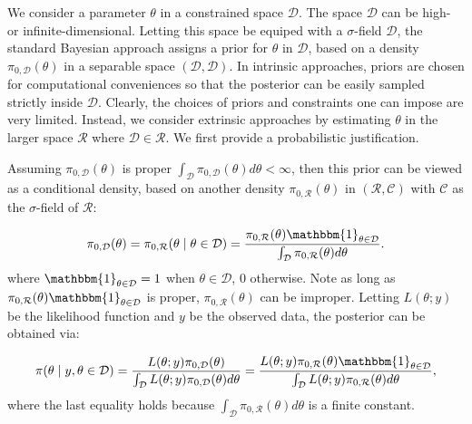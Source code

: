 \documentclass[10pt]{article}
\newcommand{\mc}[1]{\mathcal{#1}}
\begin{document}
We consider a parameter $\theta$ in a constrained space $\mc D$. The space $\mc D$ can be high- or infinite-dimensional. Letting this space be equiped with a $\sigma$-field $\mathscr D$, the standard Bayesian approach assigns a prior for $\theta$ in $\mc D$, based on a density $\pi_{0,\mc D}(\theta)$ in a separable space $(\mc D, \mathscr D)$. In intrinsic approaches, priors are chosen for computational conveniences so that the posterior can be easily sampled strictly inside $\mc D$. Clearly, the choices of priors and constraints one can impose are very limited. Instead, we consider extrinsic approaches by estimating $\theta$ in the larger space $\mc R$ where $\mc D\in \mc R$. We first provide a probabilistic justification.


Assuming $\pi_{0,\mc D}(\theta)$ is proper $\int_{\mc D} \pi_{0,\mc D}(\theta) d\theta <\infty$, then this prior can be viewed as a conditional density, based on another density $\pi_{0,\mc R}(\theta)$ in $(\mc R, \mathscr C)$ with $\mathscr C$ as the $\sigma$-field of $\mc R$:

\begin{equation}
\begin{aligned}
\pi_{0,\mc D}(\theta)= \pi_{0,\mc R}(\theta \mid \theta \in \mc D) = \frac{ \pi_{0,\mc R}(\theta) \mathbbm{1}_{\theta\in \mc D} }{ \int_{\mc D}  \pi_{0,\mc R}(\theta)d\theta }.
\end{aligned}
\end{equation}
where $\mathbbm{1}_{\theta \in \mc D}=1$ when $\theta \in \mc D$, $0$ otherwise. Note  as long as $\pi_{0,\mc R}(\theta) \mathbbm{1}_{\theta\in \mc D}$ is proper, $\pi_{0,\mc R}(\theta)$ can be improper. Letting $L(\theta;y)$ be the likelihood function and $y$ be the observed data, the posterior can be obtained via:

\begin{equation}
\begin{aligned}
\label{exact_posterior}
\pi(\theta \mid y, \theta \in \mc D) = \frac{ L(\theta;y)\pi_{0,\mc D}(\theta)}{\int_{\mc D} L(\theta;y)\pi_{0,\mc D}(\theta) d\theta } = \frac{ L(\theta;y)\pi_{0,\mc R}(\theta) \mathbbm{1}_{\theta\in \mc D} }{\int_{\mc D} L(\theta;y)\pi_{0,\mc R}(\theta) d\theta },
\end{aligned}
\end{equation}
where the last equality holds because $\int_{\mc D}  \pi_{0,\mc R}(\theta) d\theta$ is a finite constant.
\end{document}
